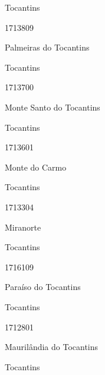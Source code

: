 \documentclass[
  letterpaper,
]{report}
\begin{document}
\n    

\n      

Tocantins

\n      

1713809

\n      

Palmeiras do Tocantins

\n    

\n    

\n      

Tocantins

\n      

1713700

\n      

Monte Santo do Tocantins

\n    

\n    

\n      

Tocantins

\n      

1713601

\n      

Monte do Carmo

\n    

\n    

\n      

Tocantins

\n      

1713304

\n      

Miranorte

\n    

\n    

\n      

Tocantins

\n      

1716109

\n      

Paraíso do Tocantins

\n    

\n    

\n      

Tocantins

\n      

1712801

\n      

Maurilândia do Tocantins

\n    

\n    

\n      

Tocantins

\n      
\end{document}
